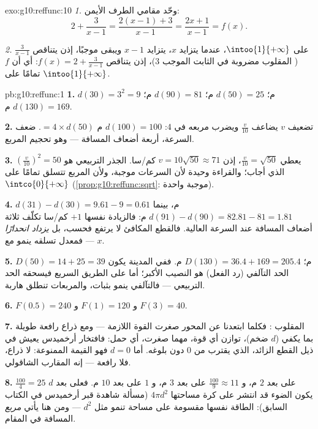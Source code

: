 \begin{solution}{exo:g10:reffunc:10}
\emph{1.} وحّد مقامي الطرف الأيمن:
\[
2 + \frac{3}{x-1} = \frac{2(x-1) + 3}{x - 1} = \frac{2x + 1}{x - 1}
= f(x).
\]

\emph{2.} على $\intoo{1}{+\infty}$، عندما يتزايد $x$، يتزايد $x - 1$
ويبقى موجبًا، إذن يتناقص $\frac{3}{x-1}$ ( المقلوب مضروبة
في الثابت الموجب $3$)، إذن يتناقص $f(x) = 2 + \frac{3}{x-1}$:
أي أن $f$  تمامًا على $\intoo{1}{+\infty}$.
\end{solution}

\begin{solution}{pb:g10:reffunc:1}
\textbf{1.} $d(30) = 3^2 = 9$ م؛ $d(50) = 25$ م؛ $d(90) =
81$ م؛ $d(130) = 169$ م.

\textbf{2.} تضعيف $v$ يضاعف $\frac v{10}$ ويضرب
مربعه في $4$: $d(100) = 100$ م $= 4 \times d(50)$. ضعف
السرعة، أربعة أضعاف المسافة --- وهو تحجيم 
المربع.

\textbf{3.} $\left(\frac{v}{10}\right)^2 = 50$ يعطي
$\frac{v}{10} = \sqrt{50}$، إذن $v = 10\sqrt{50} \approx 71$
كم/سا. الجذر التربيعي هو الذي أجاب؛ والقراءة وحيدة
لأن السرعات موجبة، ولأن  المربع تتسلق تمامًا على
$\intco{0}{+\infty}$
(\cref{prop:g10:reffunc:sqrt}:  موجبة واحدة).

\textbf{4.} $d(31) - d(30) = 9.61 - 9 = 0.61$ م، بينما
$d(91) - d(90) = 82.81 - 81 = 1.81$ م: فالزيادة نفسها $+1$ كم/سا تكلّف
ثلاثة أضعاف المسافة عند السرعة العالية. فالقطع المكافئ لا
يرتفع فحسب، بل \emph{يزداد انحدارًا} --- فمعدل تسلقه ينمو مع $x$.

\textbf{5.} $D(50) = 14 + 25 = 39$ م؛ $D(130) = 36.4 + 169 =
205.4$ م. ففي المدينة يكون الحد التآلفي (رد الفعل) هو النصيب
الأكبر؛ أما على الطريق السريع فيسحقه الحد التربيعي --- فالتآلفي
ينمو بثبات، والمربعات تنطلق هاربة.

\textbf{6.} $F(0.5) = 240$ و $F(1) = 120$ و $F(3) = 40$.

\textbf{7.}  المقلوب : فكلما ابتعدنا عن
المحور صغرت القوة اللازمة --- ومع ذراع رافعة طويلة
بما يكفي ($d$ ضخم)، توازن أي قوة، مهما صغرت، أي
حمل: فافتخار أرخميدس يعيش في ذيل القطع الزائد، الذي
يقترب من $0$ دون بلوغه. أما $d = 0$ فهو القيمة
الممنوعة: لا ذراع، فلا رافعة --- إنه المقارب الشاقولي.

\textbf{8.} $\frac{100}{4} = 25$ على بعد $2$ م، و
$\frac{100}{9} \approx 11$ على بعد $3$ م، و $1$ على بعد $10$ م. فعلى بعد
$d$ يكون الضوء قد انتشر على كرة مساحتها $4\pi d^2$
(مسألة شاهدة قبر أرخميدس في الكتاب السابق): الطاقة نفسها مقسومة على مساحة
تنمو مثل $d^2$ --- ومن هنا يأتي \emph{مربع} المسافة في المقام.


\end{solution}
